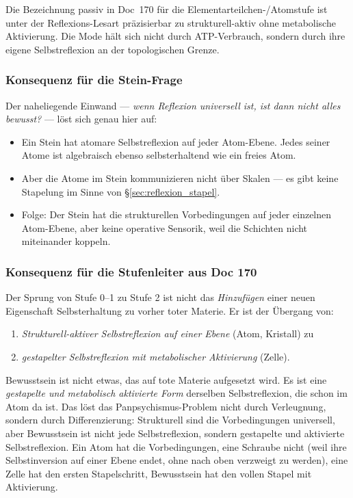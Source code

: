 \begin{insightBox}
Die Bezeichnung \glqq passiv\grqq{} in Doc~170 für die Elementarteilchen-/Atomstufe ist unter der Reflexions-Lesart präzisierbar zu \glqq strukturell-aktiv ohne metabolische Aktivierung\grqq{}. Die Mode hält sich nicht durch ATP-Verbrauch, sondern durch ihre eigene Selbstreflexion an der topologischen Grenze.
\end{insightBox}

\subsubsection*{Konsequenz für die Stein-Frage}

Der naheliegende Einwand --- \emph{wenn Reflexion universell ist, ist dann nicht alles bewusst?} --- löst sich genau hier auf:

\begin{itemize}
\item Ein Stein hat atomare Selbstreflexion auf jeder Atom-Ebene. Jedes seiner Atome ist algebraisch ebenso \glqq selbsterhaltend\grqq{} wie ein freies Atom.
\item Aber die Atome im Stein kommunizieren nicht über Skalen --- es gibt keine Stapelung im Sinne von \S\ref{sec:reflexion_stapel}.
\item Folge: Der Stein hat die strukturellen Vorbedingungen auf jeder einzelnen Atom-Ebene, aber keine operative Sensorik, weil die Schichten nicht miteinander koppeln.
\end{itemize}

\subsubsection*{Konsequenz für die Stufenleiter aus Doc 170}

Der Sprung von Stufe 0--1 zu Stufe 2 ist nicht das \emph{Hinzufügen} einer neuen Eigenschaft \glqq Selbsterhaltung\grqq{} zu vorher \glqq toter\grqq{} Materie. Er ist der Übergang von:

\begin{enumerate}
\item \emph{Strukturell-aktiver Selbstreflexion auf einer Ebene} (Atom, Kristall) zu
\item \emph{gestapelter Selbstreflexion mit metabolischer Aktivierung} (Zelle).
\end{enumerate}

\begin{interpretation}
Bewusstsein ist nicht etwas, das auf tote Materie aufgesetzt wird. Es ist eine \emph{gestapelte und metabolisch aktivierte Form} derselben Selbstreflexion, die schon im Atom da ist. Das löst das Panpsychismus-Problem nicht durch Verleugnung, sondern durch Differenzierung: Strukturell sind die Vorbedingungen universell, aber \glqq Bewusstsein\grqq{} ist nicht jede Selbstreflexion, sondern gestapelte und aktivierte Selbstreflexion. Ein Atom hat die Vorbedingungen, eine Schraube nicht (weil ihre Selbstinversion auf einer Ebene endet, ohne nach oben verzweigt zu werden), eine Zelle hat den ersten Stapelschritt, Bewusstsein hat den vollen Stapel mit Aktivierung.
\end{interpretation}

